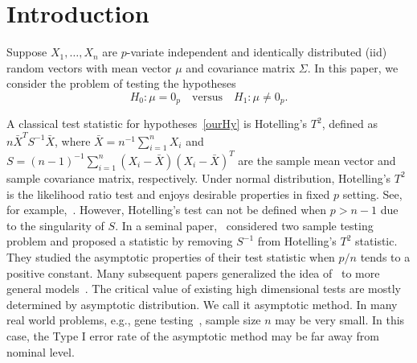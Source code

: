 \documentclass[smallcondensed,final,natbib]{svjour3}          %
\newcommand{\BP}{\mathbf{P}}
\begin{document}
\section{Introduction}

Suppose $X_{1},\ldots,X_{n}$ are $p$-variate independent and identically distributed (iid) random vectors with mean vector $\mu$ and covariance matrix $\Sigma$. In this paper, we consider the problem of testing the hypotheses
\begin{equation}\label{ourHy}
    H_0:\mu=0_p\quad \textrm{versus} \quad H_1:\mu\neq 0_p.
\end{equation}


A classical test statistic for hypotheses~\eqref{ourHy} is Hotelling's $T^2$, defined as
    $
    n\bar{X}^T S^{-1}\bar{X}
    $,
where $\bar{X}=n^{-1}\sum_{i=1}^n X_i$ and $S=(n-1)^{-1}\sum_{i=1}^n (X_i-\bar{X}) (X_i-\bar{X})^T$ are the sample mean vector and sample covariance matrix, respectively.
Under normal distribution, Hotelling's $T^2$ is the likelihood ratio test and enjoys desirable properties in fixed $p$ setting. See, for example,~\citet{andersonMultivariate}.
However, Hotelling's test can not be defined when $p>n-1$ due to the singularity of $S$.
In a seminal paper,~\citet{Bai1996Efiect} considered two sample testing problem and proposed a statistic by removing $S^{-1}$ from Hotelling's $T^2$ statistic.
They studied the asymptotic properties of their test statistic when $p/n$ tends to a positive constant.
Many subsequent papers generalized the idea of~\citet{Bai1996Efiect} to more general models~\citep{Srivastava2008A,Chen2010A,Wang2015A}.
The critical value of existing high dimensional tests are mostly determined by asymptotic distribution. 
We call it asymptotic method.
 In many real world problems, e.g., gene testing~\citep{efron2007on}, sample size $n$ may be very small.
In this case, the Type I error rate of the asymptotic method may be far away from nominal level. 
\end{document}
